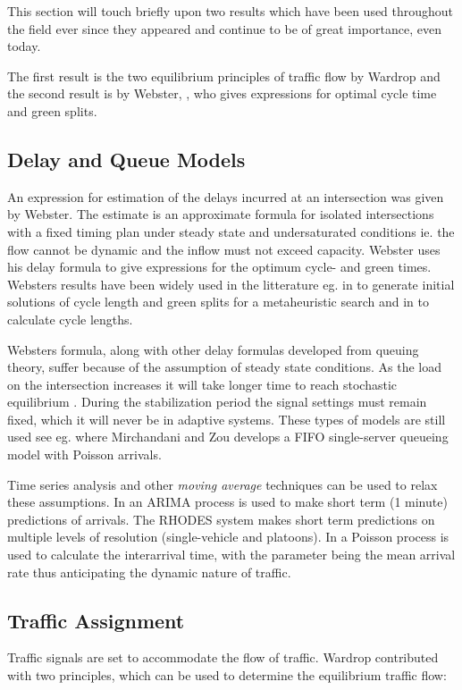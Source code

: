 \label{history}
This section will touch briefly upon two results which have been used throughout the field ever since they appeared and continue to be of great importance, even today. 

The first result is the two equilibrium principles of traffic flow by Wardrop \cite{Wardrop} and the second result is by Webster, \cite{Webster}, who gives expressions for optimal cycle time and green splits.

\subsection{Delay and Queue Models}
An expression for estimation of the delays incurred at an intersection was given by Webster. The estimate is an approximate formula for isolated intersections with a fixed timing plan under steady state and undersaturated conditions ie. the flow cannot be dynamic and the inflow must not exceed capacity. 
Webster uses his delay formula to give expressions for the optimum cycle- and green times. 
Websters results have been widely used in the litterature eg. in \cite{1} to generate initial solutions of cycle length and green splits for a metaheuristic search and in \cite{30} to calculate cycle lengths.

Websters formula, along with other delay formulas developed from queuing theory, suffer because of the assumption of steady state conditions. As the load on the intersection increases it will take longer time to reach stochastic equilibrium \cite{traffictheory}. During the stabilization period the signal settings must remain fixed, which it will never be in adaptive systems. These types of models are still used see eg. \cite{38} where Mirchandani and Zou develops a FIFO single-server queueing model with Poisson arrivals.

Time series analysis and other \textit{moving average} techniques can be used to relax these assumptions. In \cite{shortpredict} an ARIMA process is used to make short term (1 minute) predictions of arrivals. The RHODES system \cite{44} makes short term predictions on multiple levels of resolution (single-vehicle and platoons). In \cite{1}                                                                                          a Poisson process is used to calculate the interarrival time, with the parameter being the mean arrival rate thus anticipating the dynamic nature of traffic.

\subsection{Traffic Assignment}
\label{usereq}
Traffic signals are set to accommodate the flow of traffic. Wardrop contributed with two principles, which can be used to determine the equilibrium traffic flow:

